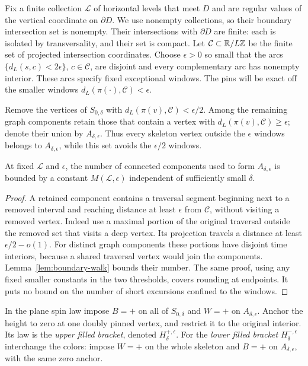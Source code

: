Fix a finite collection $\mathcal L$ of horizontal levels that meet
$D$ and are regular values of the vertical coordinate on $\partial D$.
We use nonempty collections, so their boundary intersection set is
nonempty.  Their
intersections with $\partial D$ are finite: each is isolated by
transversality, and their set is compact.  Let $\mathcal C\subset\mathbb R/L\mathbb Z$
be the finite set of projected intersection coordinates.  Choose
$\epsilon>0$ so small that the arcs
$\{d_L(s,c)<2\epsilon\}$, $c\in\mathcal C$, are disjoint and every
complementary arc has nonempty interior.  These arcs specify fixed
exceptional windows.  The pins will be exact off the smaller windows
$d_L(\pi(\cdot),\mathcal C)<\epsilon$.

Remove the vertices of $S_{0,\delta}$ with
$d_L(\pi(v),\mathcal C)<\epsilon/2$.  Among the remaining graph
components retain those that contain a vertex with
$d_L(\pi(v),\mathcal C)\ge\epsilon$; denote their union by
$A_{\delta,\epsilon}$.  Thus every skeleton vertex outside the
$\epsilon$ windows belongs to $A_{\delta,\epsilon}$, while this set
avoids the $\epsilon/2$ windows.

\begin{lemma}\label{pins:label-count}
At fixed $\mathcal L$ and $\epsilon$, the number of connected
components used to form $A_{\delta,\epsilon}$ is bounded by a constant
$M(\mathcal L,\epsilon)$ independent of sufficiently small $\delta$.
\end{lemma}

\begin{proof}
A retained component contains a traversal segment beginning next to a
removed interval and reaching distance at least $\epsilon$ from
$\mathcal C$, without visiting a removed vertex.  Indeed use a maximal
portion of the original traversal outside the removed set that visits
a deep vertex.  Its projection travels a distance at least
$\epsilon/2-o(1)$.  For distinct graph components these portions have
disjoint time interiors, because a shared traversal vertex would join
the components.  Lemma~\ref{lem:boundary-walk} bounds their number.
The same proof, using any fixed smaller constants in the two thresholds,
covers rounding at endpoints.  It puts no bound on the number of short
excursions confined to the windows.
\end{proof}

\begin{definition}\label{def:brackets}
In the plane spin law impose $B=+$ on all of $S_{0,\delta}$ and $W=+$
on $A_{\delta,\epsilon}$.  Anchor the height to zero at one doubly pinned
vertex, and restrict it to the original interior.  Its law is the
\emph{upper filled bracket}, denoted $H_\delta^{+,\epsilon}$.  For the
\emph{lower filled bracket} $H_\delta^{-,\epsilon}$ interchange the
colors: impose $W=+$ on the whole skeleton and $B=+$ on
$A_{\delta,\epsilon}$, with the same zero anchor.
\end{definition}

